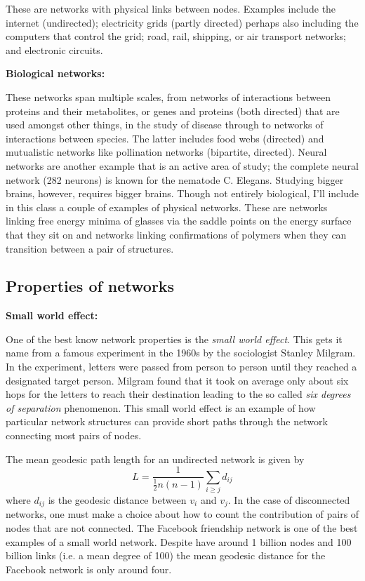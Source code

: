 \documentclass{article}
\begin{document}
These are networks with physical links between nodes. Examples include the internet (undirected); electricity grids (partly directed) perhaps also including the computers that control the grid; road, rail, shipping, or air transport networks; and electronic circuits. 


{\bf Biological networks:} 

These networks span multiple scales, from networks of interactions between proteins and their metabolites, or genes and proteins (both directed) that are used amongst other things, in the study of disease through to networks of interactions between species. The latter includes food webs (directed) and mutualistic networks like pollination networks (bipartite, directed). Neural networks are another example that is an active area of study; the complete neural network (282 neurons) is known for the nematode C. Elegans. Studying bigger brains, however, requires bigger brains. Though not entirely biological, I'll include in this class a couple of examples of physical networks. These are networks linking free energy minima of glasses via the saddle points on the energy surface that they sit on and networks linking confirmations of polymers when they can transition between a pair of structures. 


\subsection{Properties of networks}

{\bf Small world effect:}

One of the best know network properties is the \emph{small world effect}. This gets it name from a famous experiment in the 1960s by the sociologist Stanley Milgram. In the experiment, letters were passed from person to person until they reached a designated target person. Milgram found that it took on average only about six hops for the letters to reach their destination leading to the so called \emph{six degrees of separation} phenomenon. This small world effect is an example of how particular network structures can provide short paths through the network connecting most pairs of nodes. 

The mean geodesic path length for an undirected network is given by
$$
	L =\frac{1}{\frac12 n(n-1)}\sum_{i\geq j} d_{ij}
$$
where $d_{ij}$ is the geodesic distance between $v_i$ and $v_j$. In the case of disconnected networks, one must make a choice about how to count the contribution of pairs of nodes that are not connected. The Facebook friendship network is one of the best examples of a small world network. Despite have around 1 billion nodes and 100 billion links (i.e. a mean degree of 100) the mean geodesic distance for the Facebook network is only around four.
\end{document}
